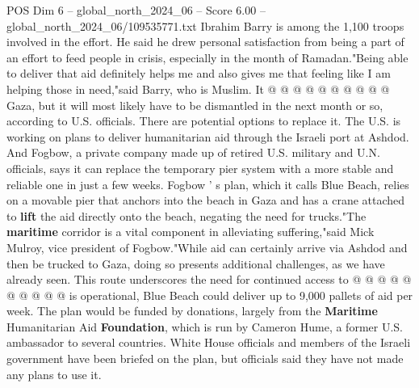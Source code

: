 \begin{textsample}{POS Dim 6 – global\_north\_2024\_06 – Score 6.00 – global\_north\_2024\_06/109535771.txt}
Ibrahim Barry is among the 1,100 troops involved in the effort.
He said he drew personal satisfaction from being a part of an effort to feed people in crisis, especially in the month of Ramadan."Being able to deliver that aid definitely helps me and also gives me that feeling like I am helping those in need,"said Barry, who is Muslim.
It @ @ @ @ @ @ @ @ @ @ Gaza, but it will most likely have to be dismantled in the next month or so, according to U.S. officials.
There are potential options to replace it.
The U.S. is working on plans to deliver humanitarian aid through the Israeli port at Ashdod.
And Fogbow, a private company made up of retired U.S. military and U.N. officials, says it can replace the temporary pier system with a more stable and reliable one in just a few weeks.
Fogbow ' s plan, which it calls Blue Beach, relies on a movable pier that anchors into the beach in Gaza and has a crane attached to \textbf{lift} the aid directly onto the beach, negating the need for trucks."The \textbf{maritime} corridor is a vital component in alleviating suffering,"said Mick Mulroy, vice president of Fogbow."While aid can certainly arrive via Ashdod and then be trucked to Gaza, doing so presents additional challenges, as we have already seen.
This route underscores the need for continued access to @ @ @ @ @ @ @ @ @ @ is operational, Blue Beach could deliver up to 9,000 pallets of aid per week.
The plan would be funded by donations, largely from the \textbf{Maritime} Humanitarian Aid \textbf{Foundation}, which is run by Cameron Hume, a former U.S. ambassador to several countries.
White House officials and members of the Israeli government have been briefed on the plan, but officials said they have not made any plans to use it.

\end{textsample}
